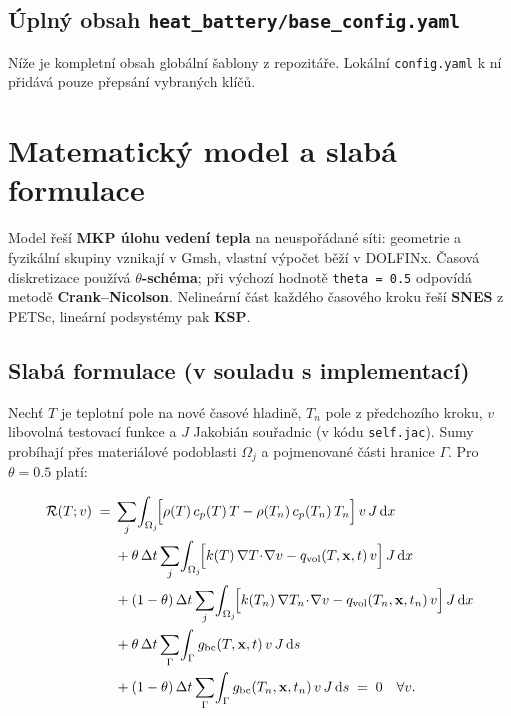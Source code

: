 \documentclass[a4paper,11pt]{article}
\begin{document}
\subsection*{Úplný obsah \texttt{heat\_battery/base\_config.yaml}}

Níže je kompletní obsah globální šablony z repozitáře. Lokální
\texttt{config.yaml} k ní přidává pouze přepsání vybraných klíčů.

\begin{minipage}[t]{\linewidth}

\end{minipage}

\section{Matematický model a slabá formulace}\label{sec:math}

Model řeší \textbf{MKP úlohu vedení tepla} na neuspořádané síti: geometrie
a fyzikální skupiny vznikají v Gmsh, vlastní výpočet běží v DOLFINx. Časová
diskretizace používá \textbf{$\theta$-schéma}; při výchozí hodnotě
\texttt{theta = 0.5} odpovídá metodě \textbf{Crank--Nicolson}. Nelineární část
každého časového kroku řeší \textbf{SNES} z PETSc, lineární podsystémy pak
\textbf{KSP}.

\subsection*{Slabá formulace (v souladu s implementací)}

Nechť \(T\) je teplotní pole na nové časové hladině, \(T_n\) pole z předchozího
kroku, \(v\) libovolná testovací funkce a \(J\) Jakobián souřadnic
(v kódu \texttt{self.jac}). Sumy probíhají přes materiálové podoblasti
\(\Omega_j\) a pojmenované části hranice \(\Gamma\). Pro \(\theta = 0.5\) platí:

\begin{equation*}
\begin{aligned}
\mathcal{R}(T;v)\;=\;
&\sum_{j}\!\int_{\Omega_j}\!\Bigl[\rho(T)\,c_p(T)\,T-\rho(T_n)\,c_p(T_n)\,T_n\Bigr]\,v\,J\,\mathrm{d}x\\
&+\theta\,\Delta t\sum_{j}\!\int_{\Omega_j}\!\Bigl[k(T)\,\nabla T\!\cdot\!\nabla v - q_{\mathrm{vol}}(T,\mathbf{x},t)\,v\Bigr]\,J\,\mathrm{d}x\\
&+(1-\theta)\,\Delta t\sum_{j}\!\int_{\Omega_j}\!\Bigl[k(T_n)\,\nabla T_n\!\cdot\!\nabla v - q_{\mathrm{vol}}(T_n,\mathbf{x},t_n)\,v\Bigr]\,J\,\mathrm{d}x\\
&+\theta\,\Delta t\sum_{\Gamma}\!\int_{\Gamma} g_{\mathrm{bc}}(T,\mathbf{x},t)\,v\,J\,\mathrm{d}s\\
&+(1-\theta)\,\Delta t\sum_{\Gamma}\!\int_{\Gamma} g_{\mathrm{bc}}(T_n,\mathbf{x},t_n)\,v\,J\,\mathrm{d}s\;=\;0\quad\forall v.
\end{aligned}
\end{equation*}
\end{document}
